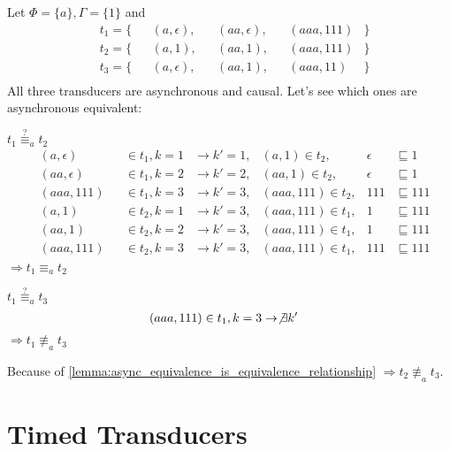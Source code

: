 \begin{exmp}[name = Asynchronous equivalence of Transducers]
  Let \(\Phi = \{a\}, \Gamma = \{1\}\) and \\
  \begin{align*}
    &t_1 = \{&&(a,\epsilon),  &&(aa,\epsilon),  &&(aaa,111)   &\} \\
    &t_2 = \{&&(a,1),         &&(aa,1),         &&(aaa,111)   &\} \\
    &t_3 = \{&&(a,\epsilon),  &&(aa,1),         &&(aaa,11)    &\}\\
  \end{align*}
  All three transducers are asynchronous and causal.
  Let's see which ones are asynchronous equivalent:

  \(t_1 \stackrel{?}{\equiv}_a t_2\)
  \begin{align*}
    &(a,\epsilon)  &&\in t_1, k = 1 &\rightarrow k' = 1, &(a,1)     \in t_2, &\epsilon  &\sqsubseteq 1 \\
    &(aa,\epsilon) &&\in t_1, k = 2 &\rightarrow k' = 2, &(aa,1)    \in t_2, &\epsilon  &\sqsubseteq 1 \\
    &(aaa,111)     &&\in t_1, k = 3 &\rightarrow k' = 3, &(aaa,111) \in t_2, &111       &\sqsubseteq 111 \\
    &(a,1)         &&\in t_2, k = 1 &\rightarrow k' = 3, &(aaa,111) \in t_1, &1         &\sqsubseteq 111 \\
    &(aa,1)        &&\in t_2, k = 2 &\rightarrow k' = 3, &(aaa,111) \in t_1, &1         &\sqsubseteq 111 \\
    &(aaa,111)     &&\in t_2, k = 3 &\rightarrow k' = 3, &(aaa,111) \in t_1, &111       &\sqsubseteq 111 \\
  \end{align*}
  \(\Rightarrow t_1 \equiv_a t_2\)

  \(t_1 \stackrel{?}{\equiv}_a t_3\)
  \begin{align*}
    &(aaa,111)     \in t_1, k = 3 \rightarrow \not\exists k'
  \end{align*}
  \(\Rightarrow t_1 \not\equiv_a t_3\)

  Because of \cref{lemma:async_equivalence_is_equivalence_relationship} \(\Rightarrow t_2 \not\equiv_a t_3\).

\end{exmp}

\section{Timed Transducers}
\label{sec:definitions:timed_transducer}

